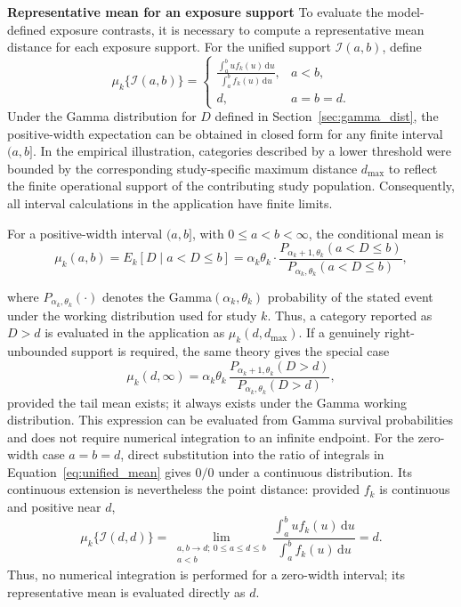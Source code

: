 \documentclass[journal=rsm]{CUP-JNL-DTM}%
\theoremstyle{definition}
\numberwithin{equation}{section}
\begin{document}
\noindent\textbf{Representative mean for an exposure support} \label{sec:mu_D} 
To evaluate the model-defined exposure contrasts, it is necessary to compute a representative mean distance for each exposure support. For the unified support $\mathcal I(a,b)$, define
\begin{equation}
  \mu_k\{\mathcal I(a,b)\}=
  \begin{cases}
    \displaystyle
    \frac{\int_a^b u f_k(u)\,\mathrm du}
         {\int_a^b f_k(u)\,\mathrm du}, & a<b,\\[10pt]
    d, & a=b=d.
  \end{cases}
  \label{eq:unified_mean}
\end{equation}
Under the Gamma distribution for $D$ defined in Section~\ref{sec:gamma_dist}, the positive-width expectation can be obtained in closed form for any finite interval $(a,b]$.
In the empirical illustration, categories described by a lower threshold were
bounded by the corresponding study-specific maximum distance $d_{\max}$ to
reflect the finite operational support of the contributing study population.
Consequently, all interval calculations in the application have finite limits.

For a positive-width interval $(a,b]$, with $0\leq a<b<\infty$, the conditional mean is
\[
  \mu_k(a,b) = E_k[D \mid a < D \le b]
  = \alpha_k\theta_k \cdot
    \frac{P_{\alpha_k+1,\theta_k}(a < D \le b)}
         {P_{\alpha_k,\theta_k}(a < D \le b)},
\]

where $P_{\alpha_k,\theta_k}(\cdot)$ denotes the
Gamma$(\alpha_k,\theta_k)$ probability of the stated event under the
working distribution used for study $k$. Thus, a category reported as $D>d$
is evaluated in the application as $\mu_k(d,d_{\max})$. If a genuinely
right-unbounded support is required, the same theory gives the special case
\[
  \mu_k(d,\infty)
  = \alpha_k\theta_k\,
    \frac{P_{\alpha_k+1,\theta_k}(D>d)}
         {P_{\alpha_k,\theta_k}(D>d)},
\]
provided the tail mean exists; it always exists under the Gamma working
distribution. This expression can be evaluated from Gamma survival
probabilities and does not require numerical integration to an infinite
endpoint. For the zero-width case $a=b=d$, direct substitution into the ratio
of integrals in Equation~\eqref{eq:unified_mean} gives $0/0$ under a continuous
distribution. Its continuous extension is nevertheless the point distance:
provided $f_k$ is continuous and positive near $d$,
\begin{equation}
  \mu_k\{\mathcal I(d,d)\}
  =\lim_{\substack{a,b\to d;\ 0\leq a\leq d\leq b\\a<b}}
    \frac{\int_a^b u f_k(u)\,\mathrm du}
         {\int_a^b f_k(u)\,\mathrm du}
  =d.
  \label{eq:point_mean}
\end{equation}
Thus, no numerical integration is performed for a zero-width interval; its
representative mean is evaluated directly as $d$.
\end{document}
